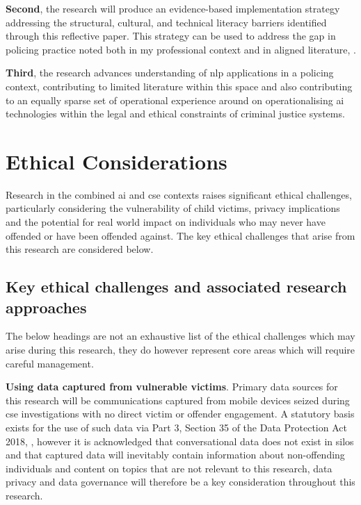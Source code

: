 \documentclass[12pt,a4paper,oneside]{report}
\begin{document}
\textbf{Second}, the research will produce an evidence-based implementation strategy addressing the structural, cultural, and technical literacy barriers identified through this reflective paper.  This strategy can be used to address the gap in policing practice noted both in my professional context and in aligned literature, \citep{laufs2022technological,thompson2021missed}. 

\textbf{Third}, the research advances understanding of \gls{nlp} applications in a policing context, contributing to limited literature within this space and also contributing to an equally sparse set of operational experience around on operationalising \gls{ai} technologies within the legal and ethical constraints of criminal justice systems.

\chapter{Ethical Considerations}
\label{ch:ethical-considerations}
Research in the combined \gls{ai} and \gls{cse} contexts raises significant ethical challenges, particularly considering the vulnerability of child victims, privacy implications and the potential for real world impact on individuals who may never have offended or have been offended against.  The key ethical challenges that arise from this research are considered below.

\section{Key ethical challenges and associated research approaches}
\label{sec:key-ethical-challenges-and-associated-research-approaches}
The below headings are not an exhaustive list of the ethical challenges which may arise during this research, they do however represent core areas which will require careful management.

\textbf{Using data captured from vulnerable victims}.  Primary data sources for this research will be communications captured from mobile devices seized during \gls{cse} investigations with no direct victim or offender engagement.  A statutory basis exists for the use of such data via Part 3, Section 35 of the Data Protection Act 2018, \citep{dpa2018hmg}, however it is acknowledged that conversational data does not exist in silos and that captured data will inevitably contain information about non-offending individuals and content on topics that are not relevant to this research, data privacy and data governance will therefore be a key consideration throughout this research.
\end{document}
